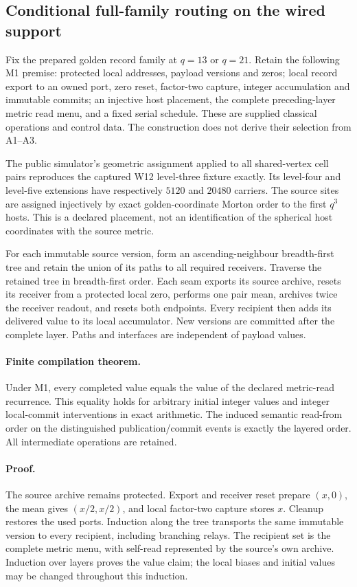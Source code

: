 \subsection{Conditional full-family routing on the wired support}
\label{sec:source-read-routing}

Fix the prepared golden record family at $q=13$ or $q=21$.  Retain the
following M1 premise: protected local addresses, payload versions and zeros;
local record export to an owned port, zero reset, factor-two capture,
integer accumulation and immutable commits; an injective host placement,
the complete preceding-layer metric read menu, and a fixed serial schedule.
These are supplied classical operations and control data.  The construction
does not derive their selection from A1--A3.

The public simulator's geometric assignment applied to all shared-vertex
cell pairs reproduces the captured W12 level-three fixture exactly.  Its
level-four and level-five extensions have respectively $5120$ and $20480$
carriers.  The source sites are assigned injectively by exact golden-coordinate
Morton order to the first $q^3$ hosts.  This is a declared placement, not an
identification of the spherical host coordinates with the source metric.

For each immutable source version, form an ascending-neighbour breadth-first
tree and retain the union of its paths to all required receivers.  Traverse
the retained tree in breadth-first order.  Each seam exports its source
archive, resets its receiver from a protected local zero, performs one pair
mean, archives twice the receiver readout, and resets both endpoints.  Every
recipient then adds its delivered value to its local accumulator.  New
versions are committed after the complete layer.  Paths and interfaces are
independent of payload values.

\paragraph{Finite compilation theorem.}
Under M1, every completed value equals the value of the declared metric-read
recurrence.  This equality holds for arbitrary initial integer values and
integer local-commit interventions in exact arithmetic.  The induced
semantic read-from order on the distinguished publication/commit events is
exactly the layered order.  All intermediate operations are retained.

\paragraph{Proof.}
The source archive remains protected.  Export and receiver reset prepare
$(x,0)$, the mean gives $(x/2,x/2)$, and local factor-two capture stores $x$.
Cleanup restores the used ports.  Induction along the tree transports the
same immutable version to every recipient, including branching relays.
The recipient set is the complete metric menu, with self-read represented
by the source's own archive.  Induction over layers proves the value claim;
the local biases and initial values may be changed throughout this induction.

